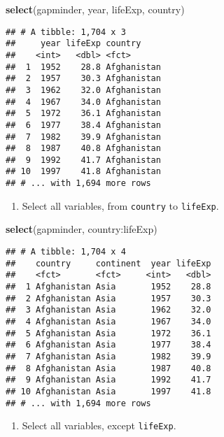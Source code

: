 \documentclass[]{article}
\newenvironment{Shaded}{\begin{snugshade}}{\end{snugshade}}
\newcommand{\KeywordTok}[1]{\textcolor[rgb]{0.13,0.29,0.53}{\textbf{{#1}}}}
\newcommand{\NormalTok}[1]{{#1}}
\providecommand{\tightlist}{%
  \setlength{\itemsep}{0pt}\setlength{\parskip}{0pt}}
\begin{document}
\begin{Shaded}
\begin{Highlighting}[]
\KeywordTok{select}\NormalTok{(gapminder, year, lifeExp, country)}
\end{Highlighting}
\end{Shaded}

\begin{verbatim}
## # A tibble: 1,704 x 3
##     year lifeExp country    
##    <int>   <dbl> <fct>      
##  1  1952    28.8 Afghanistan
##  2  1957    30.3 Afghanistan
##  3  1962    32.0 Afghanistan
##  4  1967    34.0 Afghanistan
##  5  1972    36.1 Afghanistan
##  6  1977    38.4 Afghanistan
##  7  1982    39.9 Afghanistan
##  8  1987    40.8 Afghanistan
##  9  1992    41.7 Afghanistan
## 10  1997    41.8 Afghanistan
## # ... with 1,694 more rows
\end{verbatim}

\begin{enumerate}
\def\labelenumi{\arabic{enumi}.}
\setcounter{enumi}{1}
\tightlist
\item
  Select all variables, from \texttt{country} to \texttt{lifeExp}.
\end{enumerate}

\begin{Shaded}
\begin{Highlighting}[]
\KeywordTok{select}\NormalTok{(gapminder, country:lifeExp)}
\end{Highlighting}
\end{Shaded}

\begin{verbatim}
## # A tibble: 1,704 x 4
##    country     continent  year lifeExp
##    <fct>       <fct>     <int>   <dbl>
##  1 Afghanistan Asia       1952    28.8
##  2 Afghanistan Asia       1957    30.3
##  3 Afghanistan Asia       1962    32.0
##  4 Afghanistan Asia       1967    34.0
##  5 Afghanistan Asia       1972    36.1
##  6 Afghanistan Asia       1977    38.4
##  7 Afghanistan Asia       1982    39.9
##  8 Afghanistan Asia       1987    40.8
##  9 Afghanistan Asia       1992    41.7
## 10 Afghanistan Asia       1997    41.8
## # ... with 1,694 more rows
\end{verbatim}

\begin{enumerate}
\def\labelenumi{\arabic{enumi}.}
\setcounter{enumi}{2}
\tightlist
\item
  Select all variables, except \texttt{lifeExp}.
\end{enumerate}
\end{document}
